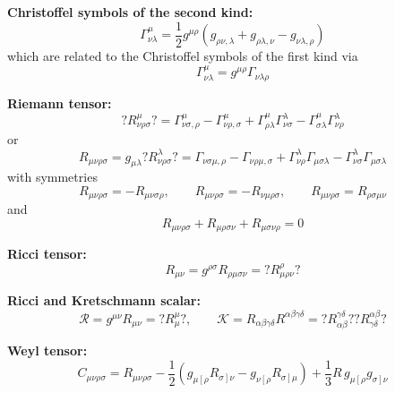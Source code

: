 \documentclass[10pt,twoside,notitlepage,a4paper,fleqn,openbib]{report}
\def\antil{\left[\right.}
\def\antir{\left.\right]}
\begin{document}
{\bf Christoffel symbols of the second kind:}
\begin{equation}
  \label{eq:ChristoffelSymbols}
  \Gamma_{\nu\lambda}^{\mu} = \frac{1}{2}g^{\mu\rho}\left(g_{\rho\nu,\lambda}+g_{\rho\lambda,\nu}-g_{\nu\lambda,\rho}\right)
\end{equation}
which are related to the Christoffel symbols of the first kind via
\begin{equation}
  \Gamma_{\nu\lambda}^{\mu} = g^{\mu\rho}\Gamma_{\nu\lambda\rho}
\end{equation}

{\bf Riemann tensor:}
\begin{equation}
   \label{eq:RiemannTensor}
   ?R^{\mu}_{\nu\rho\sigma}? = \Gamma_{\nu\sigma,\rho}^{\mu}-\Gamma_{\nu\rho,\sigma}^{\mu}+\Gamma_{\rho\lambda}^{\mu}\Gamma_{\nu\sigma}^{\lambda}-\Gamma_{\sigma\lambda}^{\mu}\Gamma_{\nu\rho}^{\lambda}
\end{equation}
or
\begin{equation}
  R_{\mu\nu\rho\sigma} = g_{\mu\lambda}?R^{\lambda}_{\nu\rho\sigma}? = \Gamma_{\nu\sigma\mu,\rho}-\Gamma_{\nu\rho\mu,\sigma}+\Gamma_{\nu\rho}^{\lambda}\Gamma_{\mu\sigma\lambda}-\Gamma_{\nu\sigma}^{\lambda}\Gamma_{\mu\sigma\lambda}
\end{equation}
with symmetries
\begin{equation}
  R_{\mu\nu\rho\sigma} = -R_{\mu\nu\sigma\rho},\qquad R_{\mu\nu\rho\sigma} = -R_{\nu\mu\rho\sigma},\qquad R_{\mu\nu\rho\sigma} = R_{\rho\sigma\mu\nu}
\end{equation}
and
\begin{equation}
  R_{\mu\nu\rho\sigma} + R_{\mu\rho\sigma\nu} + R_{\mu\sigma\nu\rho} = 0
\end{equation}

{\bf Ricci tensor:}
\begin{equation}
  R_{\mu\nu} = g^{\rho\sigma}R_{\rho\mu\sigma\nu} = ?R^{\rho}_{\mu\rho\nu}?
\end{equation}

{\bf Ricci and Kretschmann scalar:}
\begin{equation}
  \mathcal{R} = g^{\mu\nu}R_{\mu\nu} = ?R^{\mu}_{\mu}?, \qquad \mathcal{K} = R_{\alpha\beta\gamma\delta}R^{\alpha\beta\gamma\delta} = ?R^{\gamma\delta}_{\alpha\beta}??R^{\alpha\beta}_{\gamma\delta}?
\end{equation}

{\bf Weyl tensor:}
\begin{equation}
  C_{\mu\nu\rho\sigma} = R_{\mu\nu\rho\sigma}-\frac{1}{2}\left(g_{\mu\antil\rho}R_{\sigma\antir\nu}-g_{\nu\antil\rho}R_{\sigma\antir\mu}\right)+\frac{1}{3}R\,g_{\mu\antil\rho}g_{\sigma\antir\nu}
\end{equation}
\end{document}
